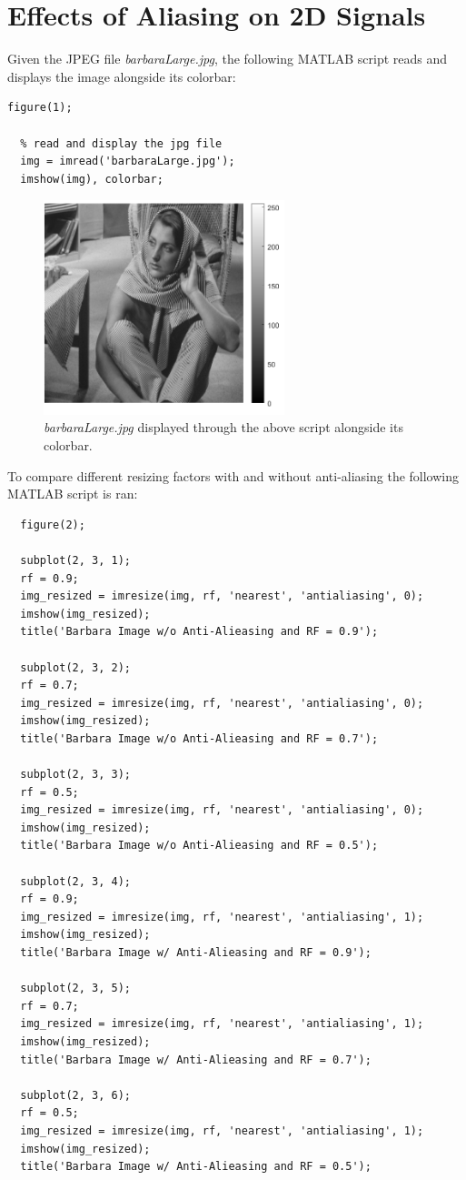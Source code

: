\documentclass[a4paper, 10pt]{article}
\begin{document}
\section{Effects of Aliasing on 2D Signals}
Given the JPEG file \textit{barbaraLarge.jpg}, the following MATLAB script reads and displays the image alongside
its colorbar:
\begin{lstlisting}[style=Matlab-editor, basicstyle=\small\ttfamily]
  figure(1);

  % read and display the jpg file
  img = imread('barbaraLarge.jpg');
  imshow(img), colorbar;
\end{lstlisting}
\begin{figure}[H]
  \centering
  \includegraphics[width=7cm]{images/q4_ab.png}
  \caption{\textit{barbaraLarge.jpg} displayed through the above script alongside its colorbar.}
\end{figure}
To compare different resizing factors with and without anti-aliasing the following MATLAB script is ran:
\begin{lstlisting}[style=Matlab-editor, basicstyle=\small\ttfamily]
  % compare different resizing factors w/ and w/o anti-aliasing
  figure(2);
  
  subplot(2, 3, 1);
  rf = 0.9;
  img_resized = imresize(img, rf, 'nearest', 'antialiasing', 0);
  imshow(img_resized);
  title('Barbara Image w/o Anti-Alieasing and RF = 0.9');
  
  subplot(2, 3, 2);
  rf = 0.7;
  img_resized = imresize(img, rf, 'nearest', 'antialiasing', 0);
  imshow(img_resized);
  title('Barbara Image w/o Anti-Alieasing and RF = 0.7');
  
  subplot(2, 3, 3);
  rf = 0.5;
  img_resized = imresize(img, rf, 'nearest', 'antialiasing', 0);
  imshow(img_resized);
  title('Barbara Image w/o Anti-Alieasing and RF = 0.5');
  
  subplot(2, 3, 4);
  rf = 0.9;
  img_resized = imresize(img, rf, 'nearest', 'antialiasing', 1);
  imshow(img_resized);
  title('Barbara Image w/ Anti-Alieasing and RF = 0.9');
  
  subplot(2, 3, 5);
  rf = 0.7;
  img_resized = imresize(img, rf, 'nearest', 'antialiasing', 1);
  imshow(img_resized);
  title('Barbara Image w/ Anti-Alieasing and RF = 0.7');
  
  subplot(2, 3, 6);
  rf = 0.5;
  img_resized = imresize(img, rf, 'nearest', 'antialiasing', 1);
  imshow(img_resized);
  title('Barbara Image w/ Anti-Alieasing and RF = 0.5');
\end{lstlisting}
\end{document}
